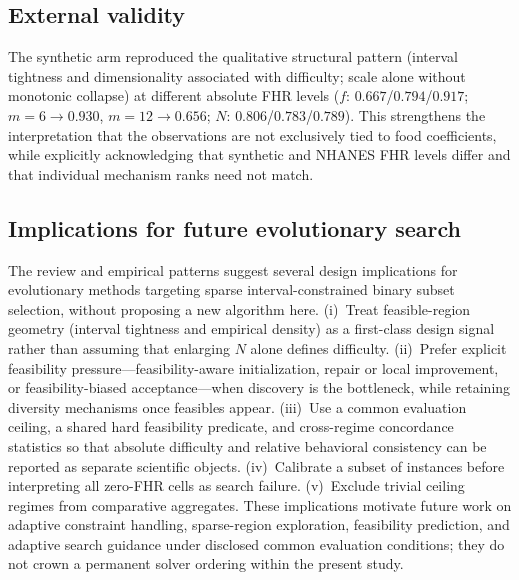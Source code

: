 \documentclass[lettersize,journal]{IEEEtran}
\begin{document}
\subsection{External validity}
The synthetic arm reproduced the qualitative structural pattern (interval tightness and dimensionality associated with difficulty; scale alone without monotonic collapse) at different absolute FHR levels ($f$: $0.667$/$0.794$/$0.917$; $m{=}6\rightarrow 0.930$, $m{=}12\rightarrow 0.656$; $N$: $0.806$/$0.783$/$0.789$).
This strengthens the interpretation that the observations are not exclusively tied to food coefficients, while explicitly acknowledging that synthetic and NHANES FHR levels differ and that individual mechanism ranks need not match.

\subsection{Implications for future evolutionary search}
The review and empirical patterns suggest several design implications for evolutionary methods targeting sparse interval-constrained binary subset selection, without proposing a new algorithm here.
(i)~Treat feasible-region geometry (interval tightness and empirical density) as a first-class design signal rather than assuming that enlarging $N$ alone defines difficulty.
(ii)~Prefer explicit feasibility pressure---feasibility-aware initialization, repair or local improvement, or feasibility-biased acceptance---when discovery is the bottleneck, while retaining diversity mechanisms once feasibles appear.
(iii)~Use a common evaluation ceiling, a shared hard feasibility predicate, and cross-regime concordance statistics so that absolute difficulty and relative behavioral consistency can be reported as separate scientific objects.
(iv)~Calibrate a subset of instances before interpreting all zero-FHR cells as search failure.
(v)~Exclude trivial ceiling regimes from comparative aggregates.
These implications motivate future work on adaptive constraint handling, sparse-region exploration, feasibility prediction, and adaptive search guidance under disclosed common evaluation conditions; they do not crown a permanent solver ordering within the present study.
\end{document}
